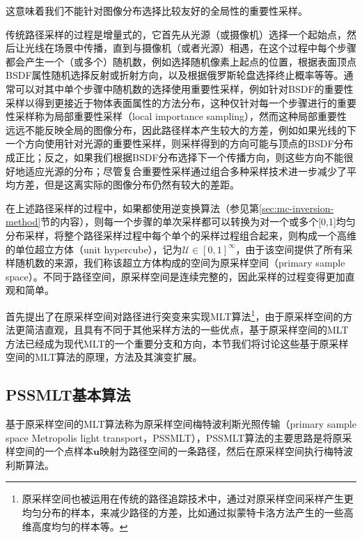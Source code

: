 这意味着我们不能针对图像分布选择比较友好的全局性的重要性采样。

传统路径采样的过程是增量式的，它首先从光源（或摄像机）选择一个起始点，然后让光线在场景中传播，直到与摄像机（或者光源）相遇，在这个过程中每个步骤都会产生一个（或多个）随机数，例如选择随机像素上起点的位置，根据表面顶点BSDF属性随机选择反射或折射方向，以及根据俄罗斯轮盘选择终止概率等等。通常可以对其中单个步骤中随机数的选择使用重要性采样，例如针对BSDF的重要性采样以得到更接近于物体表面属性的方法分布，这种仅针对每一个步骤进行的重要性采样称为局部重要性采样（local importance sampling），然而这种局部重要性远远不能反映全局的图像分布，因此路径样本产生较大的方差，例如如果光线的下一个方向使用针对光源的重要性采样，则采样得到的方向可能与顶点的BSDF分布成正比；反之，如果我们根据BSDF分布选择下一个传播方向，则这些方向不能很好地适应光源的分布；尽管复合重要性采样通过组合多种采样技术进一步减少了平均方差，但是这离实际的图像分布仍然有较大的差距。

在上述路径采样的过程中，如果都使用逆变换算法（参见第\ref{sec:mc-inversion-method}节的内容），则每一个步骤的单次采样都可以转换为对一个或多个[0,1]均匀分布采样，将整个路径采样过程中每个单个的采样过程组合起来，则构成一个高维的单位超立方体（unit hypercube），记为$\mathcal{U}\in[0,1]^{\infty}$，由于该空间提供了所有采样随机数的来源，我们称该超立方体构成的空间为原采样空间（primary sample space）。不同于路径空间，原采样空间是连续完整的，因此采样的过程变得更加直观和简单。

\cite{a:ASimpleandRobustMutationStrategyfortheMetropolisLightTransportAlgorithm}首先提出了在原采样空间对路径进行突变来实现MLT算法\footnote{原采样空间也被运用在传统的路径追踪技术中，通过对原采样空间采样产生更均匀分布的样本，来减少路径的方差，比如通过拟蒙特卡洛方法产生的一些高维高度均匀的样本等。}，由于原采样空间的方法更简洁直观，且具有不同于其他采样方法的一些优点，基于原采样空间的MLT方法已经成为现代MLT的一个重要分支和方向，本节我们将讨论这些基于原采样空间的MLT算法的原理，方法及其演变扩展。





\subsection{PSSMLT基本算法}\label{sec:mlt-pssmlt}
基于原采样空间的MLT算法称为原采样空间梅特波利斯光照传输（primary sample space Metropolis light transport，PSSMLT），PSSMLT算法的主要思路是将原采样空间的一个点样本$\mathbf{u}$映射为路径空间的一条路径，然后在原采样空间执行梅特波利斯算法。

